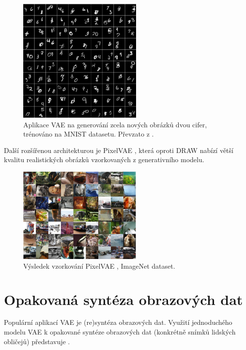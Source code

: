\begin{figure}[H]
    \centering
    \includegraphics[width=0.55\textwidth]{figures/applications/mnist_double_digits_gregor.png}
    \caption{Aplikace VAE na generování zcela nových obrázků dvou cifer, trénováno na MNIST datasetu. Převzato z \textcite{Gregor2015}.}
    \label{fig:mnist_double_digits_gregor}
\end{figure}

Další rozšířenou architekturou je PixelVAE \cite{Gulrajani2016}, která oproti DRAW nabízí větší kvalitu realistických obrázků vzorkovaných z generativního modelu.

\begin{figure}[H]
    \centering
    \includegraphics[width=0.55\textwidth]{figures/applications/image_net_pixel_vae_gulrajani.png}
    \caption{Výsledek vzorkování PixelVAE \cite{Gulrajani2016}, ImageNet dataset.}
    \label{fig:image_net_pixel_vae_gulrajani}
\end{figure}

\newpage
\section{Opakovaná syntéza obrazových dat}
\label{sec:applications_image_resynthesis}
Populární aplikací VAE je (re)syntéza obrazových dat.
Využití jednoduchého modelu VAE k opakované syntéze obrazových dat (konkrétně snímků lidských obličejů) představuje \textcite{White2016}.

